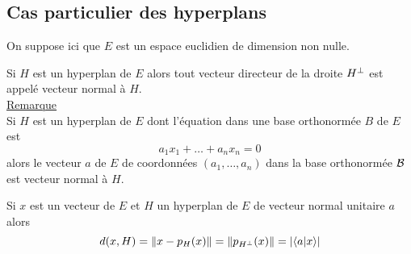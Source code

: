 \subsection{Cas particulier des hyperplans}
    On suppose ici que \(E\) est un espace euclidien de dimension non nulle.
\begin{defprop}
    Si \(H\) est un hyperplan de \(E\) alors tout vecteur directeur de la droite \(H\ortho\) est appelé vecteur normal à \(H\).\\
    \underline{Remarque}\\
    Si \(H\) est un hyperplan de \(E\) dont l’équation dans une base orthonormée \(B\) de \(E\) est
    \[a_1x_1 + \dots + a_nx_n = 0\]
    alors le vecteur \(a\) de \(E\) de coordonnées \((a_1, \dots , a_n)\) dans la base orthonormée \(\cal{B}\) est vecteur normal à \(H\).
\end{defprop}

\begin{defprop}
    Si \(x\) est un vecteur de \(E\) et \(H\) un hyperplan de \(E\) de vecteur normal unitaire \(a\) alors
    \[d(x, H) = \norme{x - p_H (x)} = \norme{p_{H\ortho} (x)} = \abs{\scal{a}{x}}\]
\end{defprop}
